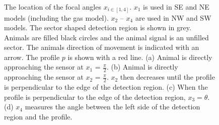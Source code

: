 \begin{figure}[t]
  \centering
{
  
}
\caption[The location of the focal angles $x_{i\in[1,4]}$]{
The location of the focal angles $x_{i\in[1,4]}$.
$x_1$ is used in SE and NE models (including the gas model).
$x_2$ -- $x_4$ are used in NW and SW models.
The sector shaped detection region is shown in grey.
Animals are filled black circles and the animal signal is an unfilled sector.
The animals direction of movement is indicated with an arrow.
The profile $p$ is shown with a red line.
(a) Animal is directly approaching the sensor at $x_1$ = $\frac{\pi}{2}$.
(b) Animal is directly approaching the sensor at $x_2$ = $\frac{\pi}{2}$.
$x_2$ then decreases until the profile is perpendicular to the edge of the detection region.
(c) When the profile is perpendicular to the edge of the detection region, $x_3 = \theta$.
(d) $x_4$ measures the angle between the left side of the detection region and the profile.}

\label{fig:xis}
\end{figure}



